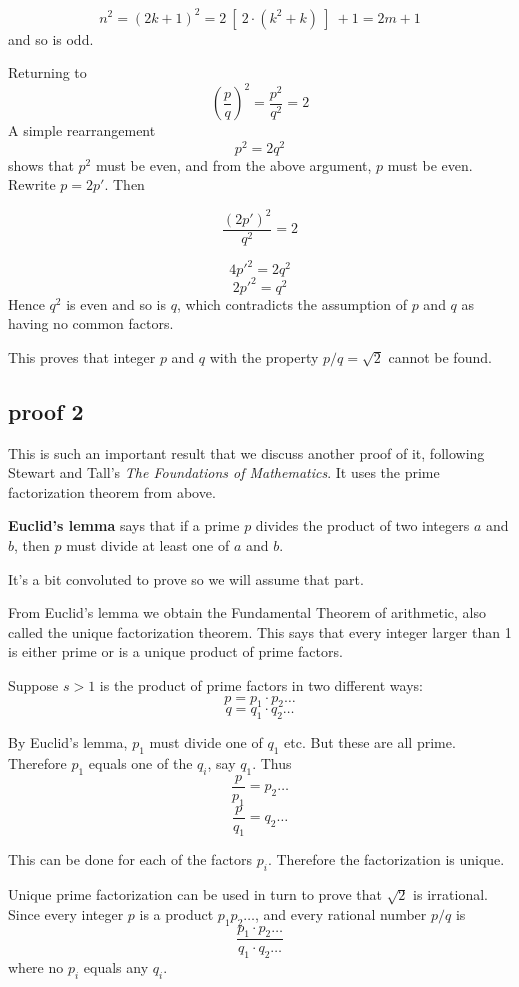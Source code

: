 \documentclass[11pt, oneside]{article}
\begin{document}
\[ n^2 = (2k + 1)^2 = 2 \ [ \ 2 \cdot (k^2 + k) \ ] \  + 1 = 2m + 1 \]
and so is odd.

Returning to
\[ (\frac{p}{q})^2 = \frac{p^2}{q^2} = 2 \]
A simple rearrangement 
\[ p^2 = 2 q^2 \]
shows that $p^2$ must be even, and from the above argument, $p$ must be even.  Rewrite $p = 2p'$.  Then

\[ \frac{(2p')^2}{q^2} = 2 \]

\[ 4 p'^2 = 2 q^2 \]
\[ 2 p'^2 = q^2 \]
Hence $q^2$ is even and so is $q$, which contradicts the assumption of $p$ and $q$ as having no common factors.  

This proves that integer $p$ and $q$ with the property $p/q = \sqrt{2}$ cannot be found.

\subsection*{proof 2}

This is such an important result that we discuss another proof of it, following Stewart and Tall's \emph{The Foundations of Mathematics}.  It uses the prime factorization theorem from above.  

\textbf{Euclid's lemma} says that if a prime $p$ divides the product of two integers $a$ and $b$, then $p$ must divide at least one of $a$ and $b$.

It's a bit convoluted to prove so we will assume that part.  

From Euclid's lemma we obtain the Fundamental Theorem of arithmetic, also called the unique factorization theorem.  This says that every integer larger than 1 is either prime or is a unique product of prime factors.

Suppose $s > 1$ is the product of prime factors in two different ways:
\[ p = p_1 \cdot p_2 \dots \]
\[ q = q_1 \cdot q_2 \dots \]

By Euclid's lemma, $p_1$ must divide one of $q_1$ etc.  But these are all prime.  Therefore $p_1$ equals one of the $q_i$, say $q_1$.  Thus
\[ \frac{p}{p_1} = p_2 \dots \]
\[ \frac{p}{q_1} = q_2 \dots \]

This can be done for each of the factors $p_i$.  Therefore the factorization is unique.

Unique prime factorization can be used in turn to prove that $\sqrt{2}$ is irrational.  Since every integer $p$ is a product $p_1 p_2 \dots$, and every rational number $p/q$ is
\[ \frac{p_1 \cdot p_2 \dots}{q_1 \cdot q_2 \dots} \]
where no $p_i$ equals any $q_i$.
\end{document}
